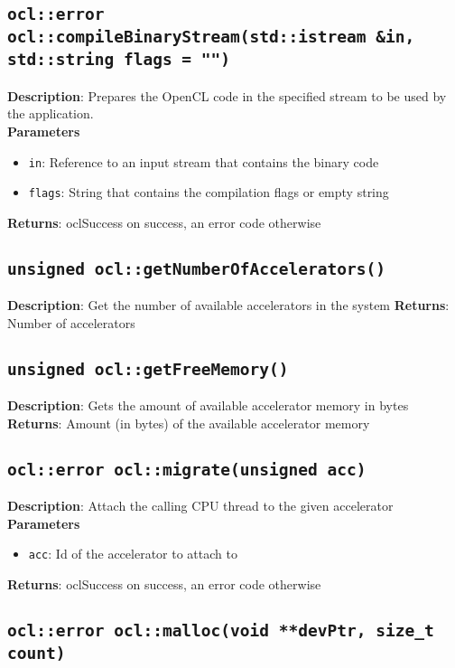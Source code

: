 \subsection{\texttt{ocl::error ocl::compileBinaryStream(std::istream \&in, std::string flags = "")}}

\textbf{Description}: Prepares the OpenCL code in the specified stream to be used by the 
application.  \\
\textbf{Parameters}
\begin{itemize}
  \item \texttt{in}: Reference to an input stream that contains the binary code
  \item \texttt{flags}: String that contains the compilation flags or empty string
\end{itemize}
\textbf{Returns}: oclSuccess on success, an error code otherwise


\subsection{\texttt{unsigned ocl::getNumberOfAccelerators()}}

\textbf{Description}: Get the number of available accelerators in the system
\textbf{Returns}: Number of accelerators

\subsection{\texttt{unsigned ocl::getFreeMemory()}}

\textbf{Description}: Gets the amount of available accelerator memory in bytes
\textbf{Returns}: Amount (in bytes) of the available accelerator memory

\subsection{\texttt{ocl::error ocl::migrate(unsigned acc)}}

\textbf{Description}: Attach the calling CPU thread to the given accelerator
\textbf{Parameters}
\begin{itemize}
  \item \texttt{acc}: Id of the accelerator to attach to
\end{itemize}
\textbf{Returns}: oclSuccess on success, an error code otherwise

\subsection{\texttt{ocl::error ocl::malloc(void **devPtr, size\_t count)}}

